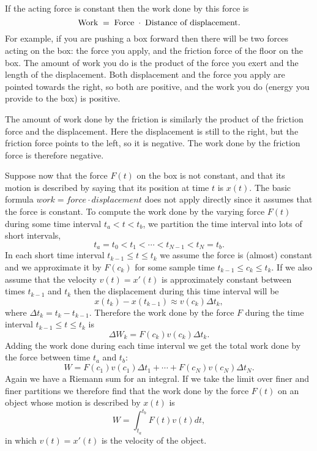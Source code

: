 If the acting force is constant then the work done by this force is
\[
\hbox{Work} \;=\; \hbox{Force}\;\cdot\;\hbox{Distance of displacement}.
\]
For example, if you are pushing a box forward then there will be two forces
acting on the box: the force you apply, and the friction force of the floor on
the box. The amount of work you do is the product of the force you exert and the
length of the displacement.  Both displacement and the force you apply are
pointed towards the right, so both are positive, and the work you do (energy you
provide to the box) is positive.

The amount of work done by the friction is similarly the product of the friction
force and the displacement.  Here the displacement is still to the right, but
the friction force points to the left, so it is negative.  The work done by the
friction force is therefore negative.

Suppose now that the force $F(t)$ on the box is not constant, and that its
motion is described by saying that its position at time $t$ is $x(t)$.  The
basic formula $\textit{work} = \textit{force}\cdot\textit{displacement}$ does
not apply directly since it assumes that the force is constant.  To compute the
work done by the varying force $F(t)$ during some time interval $t_a < t < t_b$,
we partition the time interval into lots of short intervals, 
\[
t_a = t_0 < t_1< \cdots < t_{N-1} < t_N = t_b.
\]
In each short time interval $t_{k-1}\leq t\leq t_k$ we assume the force is
(almost) constant and we approximate it by $F(c_k)$ for some sample time
$t_{k-1}\leq c_k\leq t_k$.  If we also assume that the velocity $v(t) = x'(t)$
is approximately constant between times $t_{k-1}$ and $t_k$ then the
displacement during this time interval will be
\[
x(t_k)-x(t_{k-1}) \approx v(c_k) \Delta t_k,
\]
where $\Delta t_k = t_k-t_{k-1}$.  Therefore the work done by the force $F$
during the time interval $t_{k-1}\leq t\leq t_k$ is
\[
\Delta W_k = F(c_k)v(c_k)\Delta t_k.
\]
Adding the work done during each time interval we get the total work done by the
force between time $t_a$ and $t_b$:
\[
W = F(c_1)v(c_1)\Delta t_1 + \cdots + F(c_N)v(c_N)\Delta t_N.
\]
Again we have a Riemann sum for an integral.  If we take the limit over finer
and finer partitions we therefore find that the work done by the force $F(t)$ on
an object whose motion is described by $x(t)$ is
\begin{equation}
  \label{eq:work-done-by-F}
  W = \int_{t_a}^{t_b} F(t) v(t) dt,
\end{equation}
in which $v(t) = x'(t)$ is the velocity of the object.

